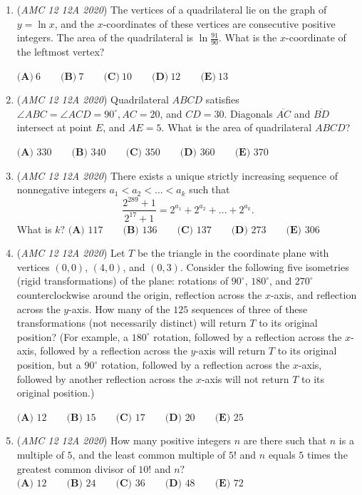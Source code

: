 \begin{enumerate}
	\item (\textit{AMC 12 12A 2020}) The vertices of a quadrilateral lie on the graph of $y = \ln x$, and the $x$-coordinates of these vertices are consecutive positive integers. The area of the quadrilateral is $\ln \frac{91}{90}$. What is the $x$-coordinate of the leftmost vertex?


 $\textbf{(A)}\ 6\qquad\textbf{(B)}\ 7\qquad\textbf{(C)}\ 10\qquad\textbf{(D)}\ 12\qquad\textbf{(E)}\ 13$


	\item (\textit{AMC 12 12A 2020}) Quadrilateral $ABCD$ satisfies $\angle ABC = \angle ACD = 90^{\circ}, AC = 20$, and $CD = 30$. Diagonals $\overline{AC}$ and $\overline{BD}$ intersect at point $E$, and $AE = 5$. What is the area of quadrilateral $ABCD$?


 $\textbf{(A) } 330 \qquad\textbf{(B) } 340 \qquad\textbf{(C) } 350 \qquad\textbf{(D) } 360 \qquad\textbf{(E) } 370$


	\item (\textit{AMC 12 12A 2020}) There exists a unique strictly increasing sequence of nonnegative integers $a_1 < a_2 < \ldots < a_k$ such that
 \[\frac{2^{289}+1}{2^{17}+1} = 2^{a_1} + 2^{a_2} + \ldots + 2^{a_k}.\]What is $k?$
$\textbf{(A) } 117 \qquad \textbf{(B) } 136 \qquad \textbf{(C) } 137 \qquad \textbf{(D) } 273 \qquad \textbf{(E) } 306$


	\item (\textit{AMC 12 12A 2020}) Let $T$ be the triangle in the coordinate plane with vertices $\left(0,0\right)$, $\left(4,0\right)$, and $\left(0,3\right)$. Consider the following five isometries (rigid transformations) of the plane: rotations of $90^{\circ}$, $180^{\circ}$, and $270^{\circ}$ counterclockwise around the origin, reflection across the $x$-axis, and reflection across the $y$-axis. How many of the $125$ sequences of three of these transformations (not necessarily distinct) will return $T$ to its original position? (For example, a $180^{\circ}$ rotation, followed by a reflection across the $x$-axis, followed by a reflection across the $y$-axis will return $T$ to its original position, but a $90^{\circ}$ rotation, followed by a reflection across the $x$-axis, followed by another reflection across the $x$-axis will not return $T$ to its original position.)


 $\textbf{(A) } 12\qquad\textbf{(B) } 15\qquad\textbf{(C) }17 \qquad\textbf{(D) }20 \qquad\textbf{(E) }25$


	\item (\textit{AMC 12 12A 2020}) How many positive integers $n$ are there such that $n$ is a multiple of $5$, and the least common multiple of $5!$ and $n$ equals $5$ times the greatest common divisor of $10!$ and $n?$
$\textbf{(A) } 12 \qquad \textbf{(B) } 24 \qquad \textbf{(C) } 36 \qquad \textbf{(D) } 48 \qquad \textbf{(E) } 72$



\end{enumerate}
